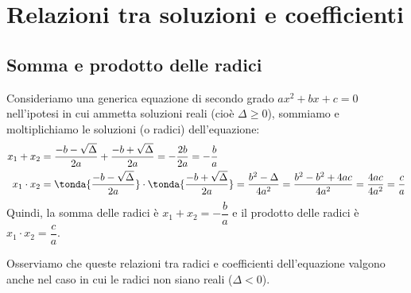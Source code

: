 % 

\section{Relazioni tra soluzioni e coefficienti}
\label{sec:eq2gr_coefficienti}

\subsection{Somma e prodotto delle radici}
Consideriamo una generica equazione di secondo grado 
\(a x^2 +bx +c = 0\) 
nell'ipotesi in cui ammetta soluzioni reali (cioè \(\Delta \geq 0\)), 
sommiamo e moltiplichiamo le soluzioni (o radici) dell'equazione:
\begin{align*}
x_1 +x_2 &= \dfrac{-b -\sqrt{\Delta}}{2a} +\dfrac{-b +\sqrt{\Delta}}{2a} = 
-\dfrac{2b}{2a} = -\dfrac{b}{a}\\
x_1 \cdot x_2 &=
\tonda{\dfrac{-b -\sqrt{\Delta}}{2a}} \cdot 
\tonda{\dfrac{-b +\sqrt{\Delta}}{2a}} = 
\dfrac{b^{2} -\Delta}{4a^2} = \dfrac{b^2 -b^2 +4ac}{4a^2} = 
\dfrac{4ac}{4a^2}=\dfrac{c}{a}
\end{align*}
Quindi, la somma delle radici è \(x_1 +x_2 = -\dfrac{b}{a}\) e il 
prodotto delle radici è \(x_1 \cdot x_2 = \dfrac{c}{a}\).

Osserviamo che queste relazioni tra radici e coefficienti dell'equazione 
valgono anche nel caso in cui le radici non siano reali (\(\Delta<0\)).

